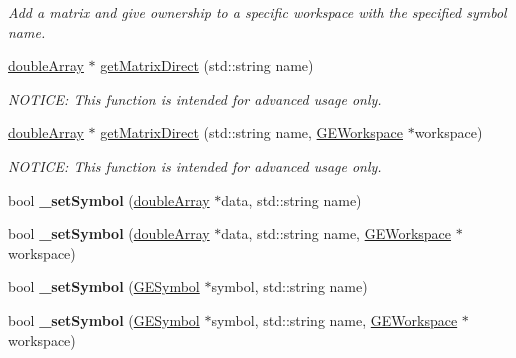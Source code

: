 \begin{DoxyCompactItemize}
\begin{DoxyCompactList}\small\item\em Add a matrix and give ownership to a specific workspace with the specified symbol name. \end{DoxyCompactList}\item 
\hyperlink{classdouble_array}{double\+Array} $\ast$ \hyperlink{class_g_a_u_s_s_a9c8e43c9e342e5d397f1154cdf7bcce8}{get\+Matrix\+Direct} (std\+::string name)
\begin{DoxyCompactList}\small\item\em N\+O\+T\+I\+CE\+: This function is intended for advanced usage only. \end{DoxyCompactList}\item 
\hyperlink{classdouble_array}{double\+Array} $\ast$ \hyperlink{class_g_a_u_s_s_a9c413d1d5d7f4f271013ecca99f9e500}{get\+Matrix\+Direct} (std\+::string name, \hyperlink{class_g_e_workspace}{G\+E\+Workspace} $\ast$workspace)
\begin{DoxyCompactList}\small\item\em N\+O\+T\+I\+CE\+: This function is intended for advanced usage only. \end{DoxyCompactList}\item 
\mbox{\label{class_g_a_u_s_s_a620a949a193326ca5e8e90f3627f59fe}} 
bool {\bfseries \+\_\+set\+Symbol} (\hyperlink{classdouble_array}{double\+Array} $\ast$data, std\+::string name)
\item 
\mbox{\label{class_g_a_u_s_s_a6231131c10764c290a6e2cc5a8780fde}} 
bool {\bfseries \+\_\+set\+Symbol} (\hyperlink{classdouble_array}{double\+Array} $\ast$data, std\+::string name, \hyperlink{class_g_e_workspace}{G\+E\+Workspace} $\ast$workspace)
\item 
\mbox{\label{class_g_a_u_s_s_a5b17b00ffdc7967218acb816d1534fc1}} 
bool {\bfseries \+\_\+set\+Symbol} (\hyperlink{class_g_e_symbol}{G\+E\+Symbol} $\ast$symbol, std\+::string name)
\item 
\mbox{\label{class_g_a_u_s_s_ab3fc0a0962842b45ace9ea31fbd58241}} 
bool {\bfseries \+\_\+set\+Symbol} (\hyperlink{class_g_e_symbol}{G\+E\+Symbol} $\ast$symbol, std\+::string name, \hyperlink{class_g_e_workspace}{G\+E\+Workspace} $\ast$workspace)
\item 
\mbox{\label{class_g_a_u_s_s_a2c061dc94f18b6c9e1e1cf648b95f001}} 

\end{DoxyCompactItemize}
